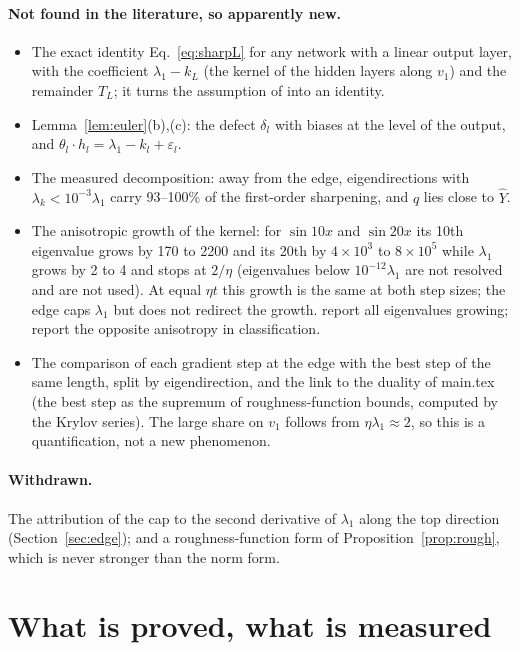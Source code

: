 \documentclass[11pt]{article}
\theoremstyle{definition}
\theoremstyle{remark}
\begin{document}
\paragraph{Not found in the literature, so apparently new.}
\begin{itemize}
\item The exact identity Eq.~\eqref{eq:sharpL} for any network with a linear output layer, with the coefficient $\lambda_1 - k_L$ (the kernel of the hidden layers along $v_1$) and the remainder $T_L$; it turns the assumption of \cite{liwangli2022} into an identity.
\item Lemma~\ref{lem:euler}(b),(c): the defect $\delta_l$ with biases at the level of the output, and $\theta_l\cdot h_l = \lambda_1 - k_l + \varepsilon_l$.
\item The measured decomposition: away from the edge, eigendirections with $\lambda_k < 10^{-3}\lambda_1$ carry 93--100\% of the first-order sharpening, and $q$ lies close to $\hat Y$.
\item The anisotropic growth of the kernel: for $\sin10x$ and $\sin20x$ its 10th eigenvalue grows by 170 to 2200 and its 20th by $4\times10^3$ to $8\times10^5$ while $\lambda_1$ grows by 2 to 4 and stops at $2/\eta$ (eigenvalues below $10^{-12}\lambda_1$ are not resolved and are not used). At equal $\eta t$ this growth is the same at both step sizes; the edge caps $\lambda_1$ but does not redirect the growth. \cite{kopitkov2020} report all eigenvalues growing; \cite{baratin2021} report the opposite anisotropy in classification.
\item The comparison of each gradient step at the edge with the best step of the same length, split by eigendirection, and the link to the duality of main.tex (the best step as the supremum of roughness-function bounds, computed by the Krylov series). The large share on $v_1$ follows from $\eta\lambda_1\approx2$, so this is a quantification, not a new phenomenon.
\end{itemize}

\paragraph{Withdrawn.}
The attribution of the cap to the second derivative of $\lambda_1$ along the top direction (Section~\ref{sec:edge}); and a roughness-function form of Proposition~\ref{prop:rough}, which is never stronger than the norm form.

\section{What is proved, what is measured}\label{sec:status}
\end{document}
